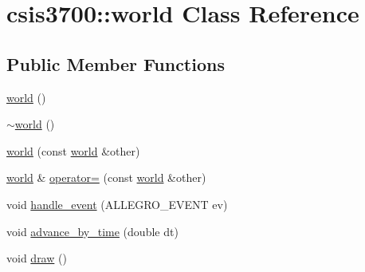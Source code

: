 \hypertarget{classcsis3700_1_1world}{\section{csis3700\-:\-:world Class Reference}
\label{classcsis3700_1_1world}
}
\subsection*{Public Member Functions}
\begin{DoxyCompactItemize}
\item 
\hyperlink{classcsis3700_1_1world_add94e82a5e7c88d9f4f2714c199693b1}{world} ()
\item 
\hyperlink{classcsis3700_1_1world_ae793effd77990768c2f7565cb2daba70}{$\sim$world} ()
\item 
\hyperlink{classcsis3700_1_1world_a323fcd5b15ee4a274bffe02cf9c7cd0e}{world} (const \hyperlink{classcsis3700_1_1world}{world} \&other)
\item 
\hyperlink{classcsis3700_1_1world}{world} \& \hyperlink{classcsis3700_1_1world_a1ce9a5a4c2a161b8d0bd079727632d62}{operator=} (const \hyperlink{classcsis3700_1_1world}{world} \&other)
\item 
void \hyperlink{classcsis3700_1_1world_a244cfed1968f6ed5133b82eebcb0c158}{handle\-\_\-event} (A\-L\-L\-E\-G\-R\-O\-\_\-\-E\-V\-E\-N\-T ev)
\item 
void \hyperlink{classcsis3700_1_1world_a2b4a33cc658001cde9d838ff50237a5f}{advance\-\_\-by\-\_\-time} (double dt)
\item 
void \hyperlink{classcsis3700_1_1world_acd1681a6ac117cf74ac4590938d60a80}{draw} ()
\end{DoxyCompactItemize}



